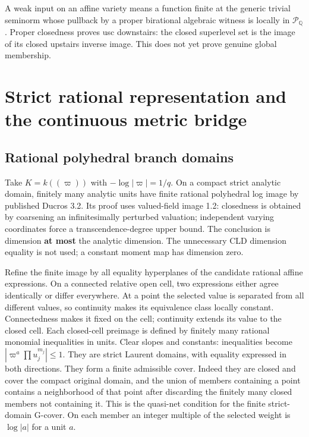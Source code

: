 \documentclass[
  10pt,
]{article}
\begin{document}
A weak input on an affine variety means a function finite at the generic
trivial seminorm whose pullback by a proper birational algebraic witness
is locally in \(\mathcal P_{\mathbb Q}\). Proper closedness proves usc
downstairs: the closed superlevel set is the image of its closed
upstairs inverse image. This does not yet prove genuine global
membership.

\section{Strict rational representation and the continuous metric
bridge}\label{strict-rational-representation-and-the-continuous-metric-bridge}

\subsection{Rational polyhedral branch
domains}\label{rational-polyhedral-branch-domains}

Take \(K=k((\varpi))\) with \(-\log|\varpi|=1/q\). On a compact strict
analytic domain, finitely many analytic units have finite rational
polyhedral log image by published Ducros 3.2. Its proof uses
valued-field image 1.2: closedness is obtained by coarsening an
infinitesimally perturbed valuation; independent varying coordinates
force a transcendence-degree upper bound. The conclusion is dimension
\textbf{at most} the analytic dimension. The unnecessary CLD dimension
equality is not used; a constant moment map has dimension zero.

Refine the finite image by all equality hyperplanes of the candidate
rational affine expressions. On a connected relative open cell, two
expressions either agree identically or differ everywhere. At a point
the selected value is separated from all different values, so continuity
makes its equivalence class locally constant. Connectedness makes it
fixed on the cell; continuity extends its value to the closed cell. Each
closed-cell preimage is defined by finitely many rational monomial
inequalities in units. Clear slopes and constants: inequalities become
\(|\varpi^a\prod u_j^{m_j}|\le1\). They are strict Laurent domains, with
equality expressed in both directions. They form a finite admissible
cover. Indeed they are closed and cover the compact original domain, and
the union of members containing a point contains a neighborhood of that
point after discarding the finitely many closed members not containing
it. This is the quasi-net condition for the finite strict-domain
G-cover. On each member an integer multiple of the selected weight is
\(\log|a|\) for a unit \(a\).
\end{document}
